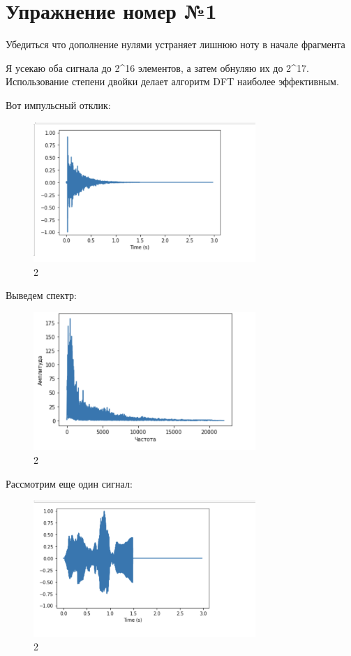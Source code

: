 \documentclass[10pt,a4paper,oneside]{article}
\begin{document}
\section{Упражнение номер №1}

Убедиться что дополнение нулями устраняет лишнюю ноту в начале фрагмента

Я усекаю оба сигнала до 2^16 элементов, а затем обнуляю их до 2^17. Использование степени двойки делает алгоритм DFT наиболее эффективным.

Вот импульсный отклик:

\begin{figure}[H]
        \centering
        \includegraphics[width=0.75\textwidth]{pics/1.png}
        \caption{2}
        \label{fig:first}
\end{figure}

Выведем спектр:

\begin{figure}[H]
        \centering
        \includegraphics[width=0.75\textwidth]{pics/2.png}
        \caption{2}
        \label{fig:first}
\end{figure}

Рассмотрим еще один сигнал:

\begin{figure}[H]
        \centering
        \includegraphics[width=0.75\textwidth]{pics/3.png}
        \caption{2}
        \label{fig:first}
\end{figure}
\end{document}

